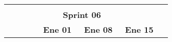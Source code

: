 \begin{longtable}[c]{llclllllllllllllllll}
        \multicolumn{1}{|l|}{}                                                                & \multicolumn{1}{l|}{}                                                          & \multicolumn{1}{l|}{}                                                            & \multicolumn{1}{l|}{}                                                                &                                 &                                 &                                 &                                 &                                 &                                 &                                 &                                 &                                 &                                 &                                 &                                 &                                 &                                 & \multicolumn{1}{l|}{}                         &  \\ \cline{1-19}
        \multicolumn{19}{|c|}{\cellcolor[HTML]{305496}\textbf{Sprint 06}}                                                                                                                                                                                                                                                                                                                                                                                                                                                                                                                                                                                                                                                                                                                                                                                                                            &  \\ \cline{1-19}
        \multicolumn{1}{|c|}{}                                                                & \multicolumn{1}{c|}{}                                                          & \multicolumn{1}{c|}{}                                                            & \multicolumn{1}{c|}{}                                                                & \multicolumn{5}{c|}{\textbf{Ene 01}}                                                                                                                                    & \multicolumn{5}{c|}{\textbf{Ene 08}}                                                                                                                                    & \multicolumn{5}{c|}{\textbf{Ene 15}}                                                                                                                                                  &  \\ \cline{5-19}

\end{longtable}
